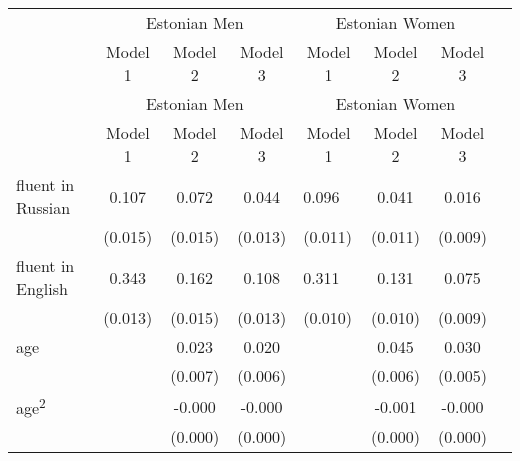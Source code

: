 	\begin{longtable}{l*{3}{c}|l*{3}{c}}
		\toprule
		& \multicolumn{3}{c|}{Estonian Men} & \multicolumn{3}{c}{Estonian Women} \\
				&\multicolumn{1}{c}{Model 1}&\multicolumn{1}{c}{Model 2}&\multicolumn{1}{c|}{Model 3}&\multicolumn{1}{c}{Model 1}&\multicolumn{1}{c}{Model 2}&\multicolumn{1}{c}{Model 3}\\ 
				\midrule
		\endfirsthead
		\toprule
				& \multicolumn{3}{c|}{Estonian Men} & \multicolumn{3}{c}{Estonian Women} \\
		&\multicolumn{1}{c}{Model 1}&\multicolumn{1}{c}{Model 2}&\multicolumn{1}{c|}{Model 3}&\multicolumn{1}{c}{Model 1}&\multicolumn{1}{c}{Model 2}&\multicolumn{1}{c}{Model 3}\\
		\midrule
		\endhead
		\midrule
		\endfoot
		\bottomrule
		\endlastfoot
		fluent in Russian   &       0.107\sym{***}&       0.072\sym{***}&       0.044\sym{**} &       0.096\sym{***}&       0.041\sym{***}&       0.016         \\
		&     (0.015)         &     (0.015)         &     (0.013)         &     (0.011)         &     (0.011)         &     (0.009)         \\
		fluent in English   &       0.343\sym{***}&       0.162\sym{***}&       0.108\sym{***}&       0.311\sym{***}&       0.131\sym{***}&       0.075\sym{***}\\
		&     (0.013)         &     (0.015)         &     (0.013)         &     (0.010)         &     (0.010)         &     (0.009)         \\
		age                 &                     &       0.023\sym{**} &       0.020\sym{**} &                     &       0.045\sym{***}&       0.030\sym{***}\\
		&                     &     (0.007)         &     (0.006)         &                     &     (0.006)         &     (0.005)         \\
		age\textsuperscript{2}    &                     &      -0.000\sym{***}&      -0.000\sym{***}&                     &      -0.001\sym{***}&      -0.000\sym{***}\\
		&                     &     (0.000)         &     (0.000)         &                     &     (0.000)         &     (0.000)         \\

\end{longtable}
